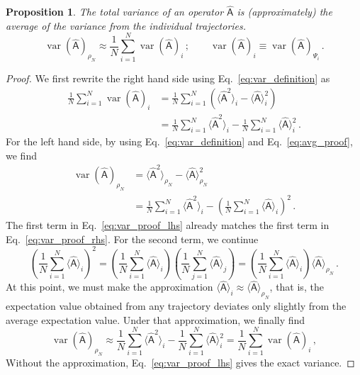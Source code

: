 \documentclass[letter,aps,pra,onecolumn,noshowpacs,superscriptaddress,preprintnumbers, kamsmath,amssymb]{revtex4}
\newcommand{\var}{\operatorname{var}}
\newcommand{\Avg}[1]{\langle#1\rangle}
\newcommand{\Op}[1]{\ensuremath{\mathsf{\hat{#1}}}}
\newtheorem{proposition}{Proposition}
\begin{document}
\begin{proposition}
  The total variance of an operator $\Op{A}$ is (approximately) the average of
  the variance from the individual trajectories.
  \begin{equation}
    \var({\Op{A}})_{\rho_N}
    \approx \frac{1}{N} \sum_{i=1}^N \var({\Op{A}})_i\,;
    \qquad \var({\Op{A}})_i \equiv \var({\Op{A}})_{\Psi_i}\,.
  \end{equation}
\end{proposition}
\begin{proof}
  We first rewrite the right hand side using Eq.~\eqref{eq:var_definition} as
  \begin{equation}
    \begin{split}
      \frac{1}{N} \sum_{i=1}^N \var({\Op{A}})_i
      &= \frac{1}{N} \sum_{i=1}^{N} \left( \Avg{\Op{A}^2}_i
          - \Avg{\Op{A}}_i^2 \right) \\
      &= \frac{1}{N} \sum_{i=1}^{N} \Avg{\Op{A}^2}_i
        - \frac{1}{N} \sum_{i=1}^{N} \Avg{\Op{A}}_i^2\,.
      \end{split}
      \label{eq:var_proof_rhs}
  \end{equation}
  For the left hand side, by using Eq.~\eqref{eq:var_definition} and
  Eq.~\eqref{eq:avg_proof}, we find
  \begin{equation}
    \begin{split}
      \var(\Op{A})_{\rho_N}
      &= \Avg{\Op{A}^2}_{\rho_N} - \Avg{\Op{A}}_{\rho_N}^2 \\
      &= \frac{1}{N} \sum_{i=1}^{N} \Avg{\Op{A}^2}_i
      - \left(\frac{1}{N} \sum_{i=1}^{N} \Avg{\Op{A}}_i\right)^2\,.
    \end{split}
    \label{eq:var_proof_lhs}
  \end{equation}
  The first term in Eq.~\eqref{eq:var_proof_lhs} already matches the first term
  in Eq.~\eqref{eq:var_proof_rhs}. For the second term, we continue
  \begin{equation}
    \left(\frac{1}{N} \sum_{i=1}^{N} \Avg{\Op{A}}_i\right)^2
    = \left(\frac{1}{N} \sum_{i=1}^{N} \Avg{\Op{A}}_i\right)
      \left(\frac{1}{N} \sum_{j=1}^{N} \Avg{\Op{A}}_j\right)
    = \left(\frac{1}{N} \sum_{i=1}^{N} \Avg{\Op{A}}_{i}\right)
      \Avg{\Op{A}}_{\rho_N}\,.
  \end{equation}
  At this point, we must make the approximation $\Avg{\Op{A}}_i \approx
  \Avg{\Op{A}}_{\rho_N}$, that is, the expectation value obtained from any
  trajectory deviates only slightly from the average expectation value.  Under
  that approximation, we finally find
  \begin{equation}
    \var({\Op{A}})_{\rho_N}
    \approx
      \frac{1}{N} \sum_{i=1}^{N} \Avg{\Op{A}^2}_i
        - \frac{1}{N} \sum_{i=1}^{N} \Avg{\Op{A}}_i^2
    = \frac{1}{N} \sum_{i=1}^N \var({\Op{A}})_i\,,
    \label{eq:var_proof}
  \end{equation}
  Without the approximation, Eq.~\eqref{eq:var_proof_lhs} gives the exact
  variance.
\end{proof}
\end{document}
